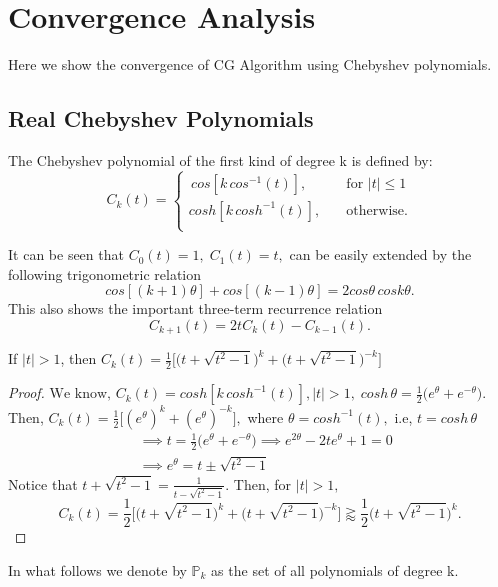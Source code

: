 \documentclass[10pt,a4paper]{article}
\begin{document}
\section{Convergence Analysis}

Here we show the convergence of CG Algorithm using Chebyshev polynomials.

\subsection{Real Chebyshev Polynomials}

\begin{definition}
The Chebyshev polynomial of the first kind of degree k is defined by:
\[   
C_k(t) = 
     \begin{cases}	
      \, cos[k\,cos^{-1}(t)], &\quad\text{for }|t|\le 1\\
       cosh[k\,cosh^{-1}(t)], &\quad\text{otherwise.}\\
     \end{cases}
\]
\end{definition}

It can be seen that $C_0(t)=1,\;C_1(t)=t,$ can be easily extended by the following trigonometric relation
$$cos[(k+1)\theta]+cos[(k-1)\theta]=2cos\theta\,cosk\theta.$$
This also shows the important three-term recurrence relation
$$C_{k+1}(t)=2tC_k(t)-C_{k-1}(t).$$

\begin{proposition}
If $|t|>1$, then $C_k(t)=\frac{1}{2}\bigg[\Big(t+\sqrt{t^2-1}\Big)^k+\Big(t+\sqrt{t^2-1}\Big)^{-k}\bigg]$
\end{proposition}

\begin{proof}
$\text{We know, }C_k(t) = cosh[k\,cosh^{-1}(t)],|t|>1,\;cosh\,\theta=\frac{1}{2}\big(e^\theta+e^{-\theta}\big).$ Then,
$C_k(t) = \frac{1}{2}\Big[(e^\theta)^k+(e^\theta)^{-k}\Big],$ where $\theta = cosh^{-1}(t),$ i.e, $t=cosh\,\theta$ 
\begin{align*}
&\implies t = \frac{1}{2}\big(e^\theta+e^{-\theta}\big) \implies e^{2\theta}-2te^\theta+1=0 \\
&\implies e^\theta = t \pm \sqrt{t^2-1}
\end{align*}
Notice that $t + \sqrt{t^2-1}=\frac{1}{t - \sqrt{t^2-1}}.$ Then, for $|t|>1,$
$$C_k(t)=\frac{1}{2}\bigg[\Big(t+\sqrt{t^2-1}\Big)^k+\Big(t+\sqrt{t^2-1}\Big)^{-k}\bigg]\gtrapprox\frac{1}{2}\Big(t+\sqrt{t^2-1}\Big)^k.$$
\end{proof}

In what follows  we denote by $\mathbb{P}_k$ as the set of all polynomials of degree k.
\end{document}
